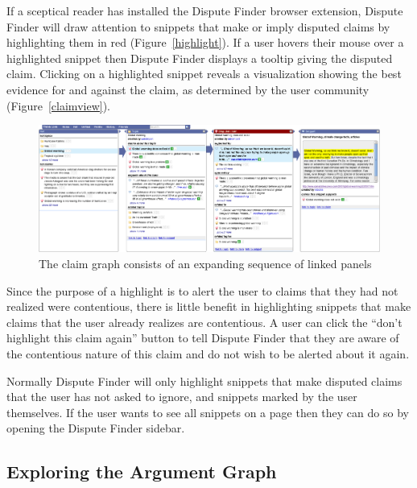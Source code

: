 \documentclass{www2010-submission}
\newcommand{\todo}[1]{}
\begin{document}
If a sceptical reader has installed the Dispute Finder browser extension, Dispute Finder will draw attention to snippets that make or imply disputed claims by highlighting them in red (Figure~\ref{highlight}). If a user hovers their mouse over a highlighted snippet then Dispute Finder displays a tooltip giving the disputed claim. Clicking on a highlighted snippet reveals a visualization showing the best evidence for and against the claim, as determined by the user community (Figure~\ref{claimview}).

\begin{figure}[tb]
	\begin{center}
	\includegraphics[width=18cm]{../screenshots/v2_panels2.png}
	\caption{The claim graph consists of an expanding sequence of linked panels}
	\label{panels}
	\end{center}
\end{figure}

Since the purpose of a highlight is to alert the user to claims that they had not realized were contentious, there is little benefit in highlighting snippets that make claims that the user already realizes are contentious. A user can click the ``don't highlight this claim again'' button to tell Dispute Finder that they are aware of the contentious nature of this claim and do not wish to be alerted about it again.

Normally Dispute Finder will only highlight snippets that make disputed claims that the user has not asked to ignore, and snippets marked by the user themselves. If the user wants to see all snippets on a page then they can do so by opening the Dispute Finder sidebar. 

\todo{ignore button}
\todo{talk about the margin?}
\todo{Talk about snippet and topic previewing}

\subsection{Exploring the Argument Graph}
\end{document}
